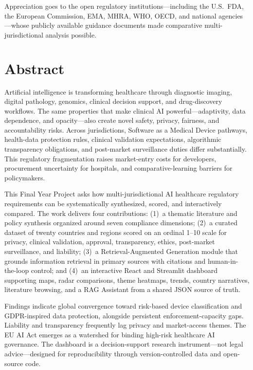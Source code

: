 \documentclass[12pt,a4paper,oneside]{report}
\begin{document}
Appreciation goes to the open regulatory institutions---including the U.S.\ FDA, the European Commission, EMA, MHRA, WHO, OECD, and national agencies---whose publicly available guidance documents made comparative multi-jurisdictional analysis possible.

\clearpage

\chapter*{Abstract}

Artificial intelligence is transforming healthcare through diagnostic imaging, digital pathology, genomics, clinical decision support, and drug-discovery workflows. The same properties that make clinical AI powerful---adaptivity, data dependence, and opacity---also create novel safety, privacy, fairness, and accountability risks. Across jurisdictions, Software as a Medical Device pathways, health-data protection rules, clinical validation expectations, algorithmic transparency obligations, and post-market surveillance duties differ substantially. This regulatory fragmentation raises market-entry costs for developers, procurement uncertainty for hospitals, and comparative-learning barriers for policymakers.

This Final Year Project asks how multi-jurisdictional AI healthcare regulatory requirements can be systematically synthesized, scored, and interactively compared. The work delivers four contributions: (1)~a thematic literature and policy synthesis organized around seven compliance dimensions; (2)~a curated dataset of twenty countries and regions scored on an ordinal 1--10 scale for privacy, clinical validation, approval, transparency, ethics, post-market surveillance, and liability; (3)~a Retrieval-Augmented Generation module that grounds information retrieval in primary sources with citations and human-in-the-loop control; and (4)~an interactive React and Streamlit dashboard supporting maps, radar comparisons, theme heatmaps, trends, country narratives, literature browsing, and a RAG Assistant from a shared JSON source of truth.

Findings indicate global convergence toward risk-based device classification and GDPR-inspired data protection, alongside persistent enforcement-capacity gaps. Liability and transparency frequently lag privacy and market-access themes. The EU AI Act emerges as a watershed for binding high-risk healthcare AI governance. The dashboard is a decision-support research instrument---not legal advice---designed for reproducibility through version-controlled data and open-source code.
\end{document}
